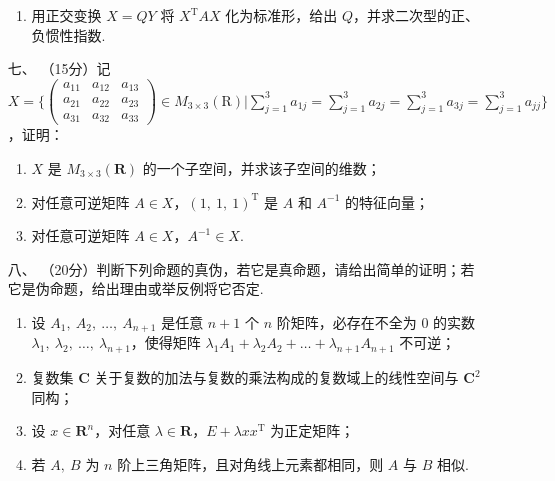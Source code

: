 \begin{enumerate}
\begin{enumerate}[label=(\arabic*)]
        \item 用正交变换 $X=QY$ 将 $X^{\mathrm{T}}AX$ 化为标准形，给出 $Q$，并求二次型的正、负惯性指数.
    \end{enumerate}
	\item[七、]（15分）记 $X=\Bigg\{\begin{pmatrix}a_{11} & a_{12} & a_{13} \\ a_{21} & a_{22} & a_{23} \\ a_{31} & a_{32} & a_{33}\end{pmatrix} \in M_{3 \times 3}(\mathrm{R}) \Bigg| \sum\limits_{j=1}^3a_{1j}=\sum\limits_{j=1}^3a_{2j}=\sum\limits_{j=1}^3a_{3j}=\sum\limits_{j=1}^3a_{jj}\Bigg\}$，证明：
    \begin{enumerate}[label=(\arabic*)]
        \item $X$ 是 $M_{3 \times 3}(\mathbf{R})$ 的一个子空间，并求该子空间的维数；

        \item 对任意可逆矩阵 $A \in X$，$(1,\ 1,\ 1)^{\mathrm{T}}$ 是 $A$ 和 $A^{-1}$ 的特征向量；

        \item 对任意可逆矩阵 $A \in X$，$A^{-1} \in X$.
    \end{enumerate}
	\item[八、]（20分）判断下列命题的真伪，若它是真命题，请给出简单的证明；若它是伪命题，给出理由或举反例将它否定.
    \begin{enumerate}[label=(\arabic*)]
        \item 设 $A_1,\ A_2,\ \dots,\ A_{n+1}$ 是任意 $n+1$ 个 $n$ 阶矩阵，必存在不全为 0 的实数 $\lambda_1,\ \lambda_2,\ \dots,\ \lambda_{n+1}$，使得矩阵 $\lambda_1A_1+\lambda_2A_2+\dots+\lambda_{n+1}A_{n+1}$ 不可逆；

        \item 复数集 $\mathbf{C}$ 关于复数的加法与复数的乘法构成的复数域上的线性空间与 $\mathbf{C}^2$ 同构；

        \item 设 $x \in \mathbf{R}^n$，对任意 $\lambda \in \mathbf{R}$，$E+\lambda xx^{\mathrm{T}}$ 为正定矩阵；

        \item 若 $A,\ B$ 为 $n$ 阶上三角矩阵，且对角线上元素都相同，则 $A$ 与 $ B$ 相似.
    \end{enumerate}
\end{enumerate}

\clearpage
